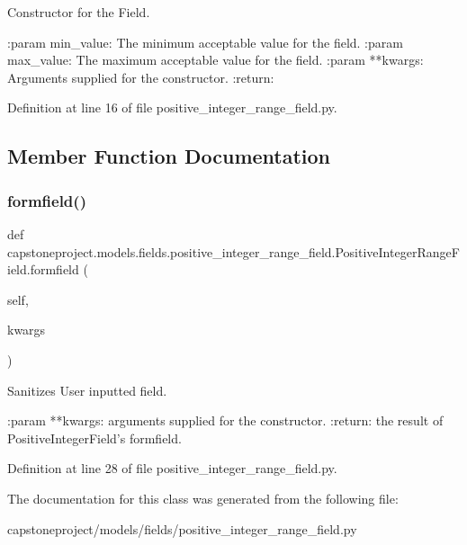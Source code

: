 \begin{DoxyVerb}Constructor for the Field.

:param min_value: The minimum acceptable value for the field.
:param max_value: The maximum acceptable value for the field.
:param **kwargs: Arguments supplied for the constructor.
:return:
\end{DoxyVerb}
 

Definition at line 16 of file positive\+\_\+integer\+\_\+range\+\_\+field.\+py.



\subsection{Member Function Documentation}
\mbox{\label{classcapstoneproject_1_1models_1_1fields_1_1positive__integer__range__field_1_1_positive_integer_range_field_a83152e904aee722d94bd2dd6058b85db}} 
\subsubsection{\texorpdfstring{formfield()}{formfield()}}
{\footnotesize\ttfamily def capstoneproject.\+models.\+fields.\+positive\+\_\+integer\+\_\+range\+\_\+field.\+Positive\+Integer\+Range\+Field.\+formfield (\begin{DoxyParamCaption}\item[{}]{self,  }\item[{}]{kwargs }\end{DoxyParamCaption})}

\begin{DoxyVerb}Sanitizes User inputted field.

:param **kwargs: arguments supplied for the constructor.
:return: the result of PositiveIntegerField's formfield.
\end{DoxyVerb}
 

Definition at line 28 of file positive\+\_\+integer\+\_\+range\+\_\+field.\+py.



The documentation for this class was generated from the following file\+:\begin{DoxyCompactItemize}
\item 
capstoneproject/models/fields/positive\+\_\+integer\+\_\+range\+\_\+field.\+py\end{DoxyCompactItemize}
